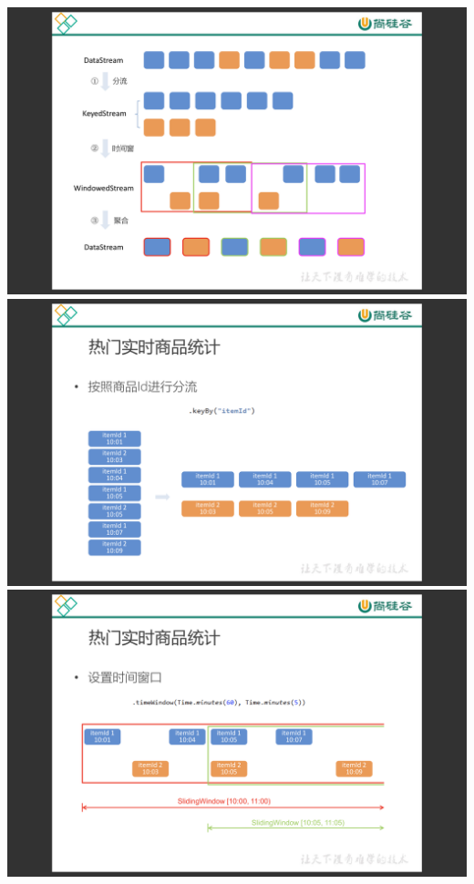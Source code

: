 \documentclass[oneside]{ctexbook}
\begin{document}
\noindent \includegraphics[width=\textwidth]{电商用户行为数据分析1.png}
\noindent \includegraphics[width=\textwidth]{电商用户行为数据分析2.png}
\noindent \includegraphics[width=\textwidth]{电商用户行为数据分析3.png}
\end{document}
